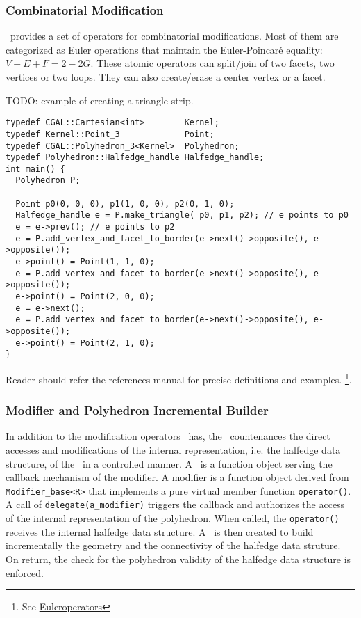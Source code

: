 \subsubsection{Combinatorial Modification}
\cgalpoly\ provides a set of operators for combinatorial 
modifications. Most of them are categorized as Euler operations
that maintain the Euler-Poincar\'e equality: $V - E + F = 2 - 2G$.
These atomic operators can split/join of two facets, two vertices 
or two loops. They can also create/erase a center vertex or a facet.

TODO: example of creating a triangle strip.
\begin{lstlisting}
typedef CGAL::Cartesian<int>        Kernel;
typedef Kernel::Point_3             Point;
typedef CGAL::Polyhedron_3<Kernel>  Polyhedron;
typedef Polyhedron::Halfedge_handle Halfedge_handle;
int main() {
  Polyhedron P;

  Point p0(0, 0, 0), p1(1, 0, 0), p2(0, 1, 0);
  Halfedge_handle e = P.make_triangle( p0, p1, p2); // e points to p0
  e = e->prev(); // e points to p2
  e = P.add_vertex_and_facet_to_border(e->next()->opposite(), e->opposite());
  e->point() = Point(1, 1, 0);
  e = P.add_vertex_and_facet_to_border(e->next()->opposite(), e->opposite());
  e->point() = Point(2, 0, 0);
  e = e->next();
  e = P.add_vertex_and_facet_to_border(e->next()->opposite(), e->opposite());
  e->point() = Point(2, 1, 0);
}
\end{lstlisting}

Reader should refer the references manual for precise definitions and
examples. \footnote{See \href{http://www.cgal.org/Manual/doc_html/
basic_lib/Polyhedron/Chapter_main.html}{Euleroperators}}.

\subsubsection{Modifier and Polyhedron Incremental Builder}
\label{sec:builder}
In addition to the modification operators \poly\ has, 
the \polybuilder\ countenances the direct accesses and modifications
of the internal representation, i.e. the halfedge data structure, 
of the \poly\ in a controlled manner. A \polybuilder\ is a function object
serving the callback mechanism of the modifier. A modifier is a function 
object derived from \lstinline!Modifier_base<R>! that implements a 
pure virtual member function \lstinline!operator()!. 
A call of \lstinline!delegate(a_modifier)! triggers the callback and 
authorizes the access of the internal representation of 
the polyhedron. When called, the \lstinline!operator()! receives the 
internal halfedge data structure. A \polybuilder\ is then 
created to build incrementally the geometry and 
the connectivity of the halfedge data struture. 
On return, the check for the polyhedron validity of the halfedge 
data structure is enforced. 

